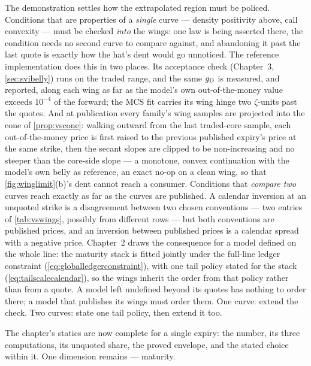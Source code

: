 The demonstration settles how the extrapolated region must be
policed.  Conditions that are properties of a \emph{single} curve ---
density positivity above, call convexity --- must be checked
\emph{into} the wings: one law is being asserted there, the condition
needs no second curve to compare against, and abandoning it past the
last quote is exactly how the hat's dent would go unnoticed.  The
reference implementation does this in two places.  Its acceptance
check (Chapter~3, \cref{sec:svibelly}) runs on the traded range, and
the same $g_{\rm D}$ is measured, and reported, along each wing as far
as the model's own out-of-the-money value exceeds $10^{-4}$ of the
forward; the MCS fit carries its wing hinge two $\zeta$-units past the
quotes.  And at publication every family's wing samples are projected
into the cone of \cref{prop:vscone}: walking outward from the last
traded-core sample, each out-of-the-money price is first raised to
the previous published expiry's price at the same strike, then the
secant slopes are clipped to be non-increasing and no steeper than the
core-side slope --- a monotone, convex continuation with the model's
own belly as reference, an exact no-op on a clean wing, so that
\cref{fig:winglimit}(b)'s dent cannot reach a consumer.
Conditions that \emph{compare two} curves reach exactly as far as the
curves are published.  A calendar inversion at an unquoted strike is
a disagreement between two chosen conventions --- two entries of
\cref{tab:vswings}, possibly from different rows --- but both
conventions are published prices, and an inversion between published
prices is a calendar spread with a negative price.  Chapter~2 draws
the consequence for a model defined on the whole line: the maturity
stack is fitted jointly under the full-line ledger constraint
(\cref{eq:globalledgerconstraint}), with one tail policy stated for
the stack (\cref{eq:tailscalecalendar}), so the wings inherit the
order from that policy rather than from a quote.  A model left
undefined beyond its quotes has nothing to order there; a model that
publishes its wings must order them.  One curve: extend the check.
Two curves: state one tail policy, then extend it too.

The chapter's statics are now complete for a single expiry: the
number, its three computations, its unquoted share, the proved
envelope, and the stated choice within it.  One dimension remains
--- maturity.
